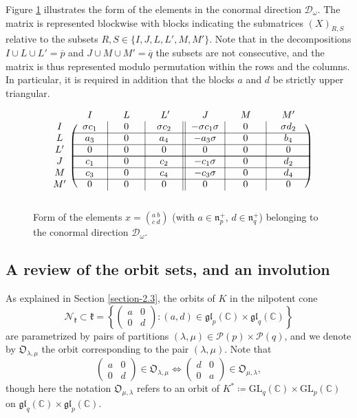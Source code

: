 \documentclass[11pt]{article}
\theoremstyle{definition}
\numberwithin{equation}{section}
\newcommand{\fk}{\mathfrak{k}}
\newcommand{\fn}{\mathfrak{n}}
\newcommand{\gl}{\mathfrak{gl}}
\newcommand{\subm}[2]{(#1)_{#2}}
\newcommand{\Nkorbit}{\mathfrak{O}}
\newcommand{\nilpotentsof}[1]{\mathcal{N}_{#1}}
\newcommand{\condir}{\mathcal{D}}
\newcommand{\intp}{\overline{p}}
\newcommand{\intq}{\overline{q}}
\newcommand{\partitionsof}[1]{\mathcal{P}(#1)}
\newcommand{\GL}{\mathrm{GL}}
\newcommand{\mC}{\mathbb{C}}
\begin{document}
Figure \ref{figure4} illustrates the form of the elements in the conormal direction $\mathcal{D}_\omega$. The matrix is represented blockwise with blocks indicating the submatrices $\subm{X}{R,S}$ relative to the subsets
$R,S\in\{I,J,L,L',M,M'\}$. Note that in the decompositions $I\cup L\cup L'=\intp$ and $J\cup M\cup M'=\intq$ the subsets are not consecutive,
and the matrix is thus represented modulo permutation within the rows and the columns. In particular, it is required in addition that the blocks $a$ and $d$ be strictly upper triangular.
\begin{figure}[h]
\[
\begin{blockarray}{ccccccc}
{} & {\quad I\quad} & {\quad L\quad} & {\quad L'\quad} & {\quad J\quad} & {\quad M\quad} & {\quad M'\quad}\\
\begin{block}{c(c|c|c||c|c|c)}
I & \sigma c_1 & 0 & \sigma c_2 & -\sigma c_1\sigma & 0 & \sigma d_2\\
\cline{2-7}
L & a_3 & 0 & a_4 & -a_3\sigma & 0 & b_4\\
\cline{2-7}
L' & 0 & 0 & 0 & 0 & 0 & 0\\
\cline{2-7}\\[-12pt] \cline{2-7}
J & c_1 & 0 & c_2 & -c_1\sigma & 0 & d_2\\
\cline{2-7}
M & c_3 & 0 & c_4 & -c_3\sigma & 0 & d_4\\
\cline{2-7}
M' & 0 & 0 & 0 & 0 & 0 & 0\\
\end{block}
\end{blockarray}
\]
\caption{Form of the elements $x=\left({}^{a \ b}_{c \ d}\right)$ (with $a\in\fn_p^+$, $d\in\fn_q^+$) belonging to the conormal direction $\condir_\omega$.}
\label{figure4}
\end{figure}

\subsection{A review of the orbit sets, and an involution}
As explained in Section \ref{section-2.3}, the orbits of $K$ in the nilpotent cone
\[
\nilpotentsof{\fk}\subset\fk=\left\{\begin{pmatrix} a & 0\\ 0 & d \end{pmatrix}: (a,d)\in \gl_p(\mC)\times\gl_q(\mC)\right\}
\]
are parametrized by pairs of partitions $(\lambda,\mu)\in\partitionsof{p}\times\partitionsof{q}$, and we denote by $\Nkorbit_{\lambda,\mu}$ the orbit corresponding to the pair $(\lambda,\mu)$.
Note that
\begin{equation}
\label{4.5new}
\begin{pmatrix} a & 0\\ 0 & d\end{pmatrix}\in\Nkorbit_{\lambda,\mu}\Longleftrightarrow \begin{pmatrix} d & 0\\ 0 & a \end{pmatrix}\in\Nkorbit_{\mu,\lambda},
\end{equation}
though here the notation $\Nkorbit_{\mu,\lambda}$ refers to an orbit of $K^*\coloneqq \GL_q(\mC)\times\GL_p(\mC)$ on $\gl_q(\mC)\times\gl_p(\mC)$.
\end{document}
